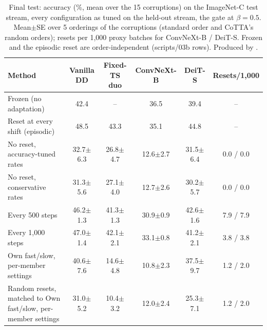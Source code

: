 \begin{table}[t]
  \centering\small
  \begin{tabular}{@{}lccccc@{}}
    \toprule
    Method & Vanilla DD & Fixed-TS duo & ConvNeXt-B & DeiT-S & Resets/1,000 \\
    \midrule
    Frozen (no adaptation) & 42.4 & -- & 36.5 & 39.4 & -- \\
    Reset at every shift (episodic) & 48.5 & 43.3 & 35.1 & 44.8 & -- \\
    \midrule
    No reset, accuracy-tuned rates & 32.7$\pm$6.3 & 26.8$\pm$4.7 & 12.6$\pm$2.7 & 31.5$\pm$6.4 & 0.0 / 0.0 \\
    No reset, conservative rates & 31.3$\pm$5.6 & 27.1$\pm$4.0 & 12.7$\pm$2.6 & 30.2$\pm$5.7 & 0.0 / 0.0 \\
    \midrule
    Every 500 steps & 46.2$\pm$1.3 & 41.3$\pm$1.3 & 30.9$\pm$0.9 & 42.6$\pm$1.6 & 7.9 / 7.9 \\
    Every 1,000 steps & 47.0$\pm$1.4 & 42.1$\pm$2.1 & 33.1$\pm$0.8 & 41.2$\pm$2.1 & 3.8 / 3.8 \\
    \midrule
    Own fast/slow, per-member settings & 40.6$\pm$7.6 & 14.6$\pm$4.8 & 10.8$\pm$2.3 & 37.5$\pm$9.7 & 1.2 / 2.0 \\
    \midrule
    Random resets, matched to Own fast/slow, per-member settings & 31.0$\pm$5.2 & 10.4$\pm$3.2 & 12.0$\pm$2.4 & 25.3$\pm$7.1 & 1.2 / 2.0 \\
    \bottomrule
  \end{tabular}
  \caption{Final test: accuracy (\%, mean over the 15 corruptions) on the ImageNet-C test stream, every configuration as tuned on the held-out stream, the gate at $\beta=0.5$. Mean$\pm$SE over 5 orderings of the corruptions (standard order and CoTTA's random orders); resets per 1,000 proxy batches for ConvNeXt-B / DeiT-S. Frozen and the episodic reset are order-independent (scripts/03b rows). Produced by .}
  \label{tab:final_test}
\end{table}
